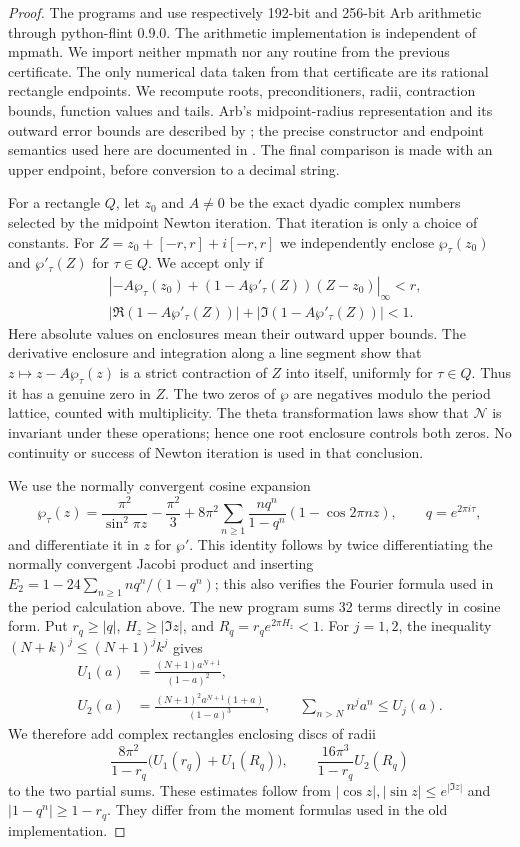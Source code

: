 \begin{proof}
The programs  and
 use respectively 192-bit and 256-bit
Arb arithmetic through python-flint 0.9.0. The arithmetic implementation
is independent of mpmath. We import neither mpmath nor any routine
from the previous certificate. The only numerical data taken from that
certificate are its rational rectangle endpoints. We recompute roots,
preconditioners, radii, contraction bounds, function values and tails.
Arb's midpoint-radius representation and its outward error bounds are
described by \citet[Sections 2--3]{Johansson2016}; the precise
constructor and endpoint semantics used here are documented in
\citet{PythonFlint2026}. The final comparison is made with an upper
endpoint, before conversion to a decimal string.

For a rectangle $Q$, let $z_0$ and $A\ne0$ be the exact dyadic complex
numbers selected by the midpoint Newton iteration. That iteration is
only a choice of constants. For $Z=z_0+[-r,r]+i[-r,r]$ we independently
enclose $\wp_\tau(z_0)$ and $\wp'_\tau(Z)$ for $\tau\in Q$.
We accept only if
\[
 \begin{split}
 &\left|-A\wp_\tau(z_0)
 +(1-A\wp'_\tau(Z))(Z-z_0)\right|_\infty<r,\\
 &|\Re(1-A\wp'_\tau(Z))|
       +|\Im(1-A\wp'_\tau(Z))|<1.
 \end{split}
\]
Here absolute values on enclosures mean their outward upper bounds.
The derivative enclosure and integration along a line segment show
that $z\mapsto z-A\wp_\tau(z)$ is a strict contraction of $Z$ into
itself, uniformly for $\tau\in Q$. Thus it has a genuine zero in $Z$.
The two zeros of $\wp$ are negatives modulo the period lattice, counted
with multiplicity. The theta transformation laws show that
$\mathcal N$ is invariant under these operations; hence one root
enclosure controls both zeros. No continuity or success of Newton
iteration is used in that conclusion.

We use the normally convergent cosine expansion
\[
 \wp_\tau(z)=\frac{\pi^2}{\sin^2\pi z}-\frac{\pi^2}{3}
 +8\pi^2\sum_{n\geq1}\frac{nq^n}{1-q^n}
                      (1-\cos 2\pi nz),\qquad q=e^{2\pi i\tau},
\]
and differentiate it in $z$ for $\wp'$. This identity follows by twice
differentiating the normally convergent Jacobi product and inserting
$E_2=1-24\sum_{n\geq1}nq^n/(1-q^n)$; this also verifies the
Fourier formula used in the period calculation above. The new program sums
32 terms directly in cosine form. Put $r_q\geq|q|$,
$H_z\geq|\Im z|$, and $R_q=r_q e^{2\pi H_z}<1$.
For $j=1,2$, the inequality $(N+k)^j\leq(N+1)^jk^j$ gives
\[
 \begin{aligned}
 U_1(a)&=\frac{(N+1)a^{N+1}}{(1-a)^2},\\
 U_2(a)&=\frac{(N+1)^2a^{N+1}(1+a)}{(1-a)^3},
 \qquad
 \sum_{n>N}n^j a^n\leq U_j(a).
 \end{aligned}
\]
We therefore add complex rectangles enclosing discs of radii
\[
 \frac{8\pi^2}{1-r_q}\bigl(U_1(r_q)+U_1(R_q)\bigr),
 \qquad \frac{16\pi^3}{1-r_q}U_2(R_q)
\]
to the two partial sums. These estimates follow from
$|\cos z|,|\sin z|\leq e^{|\Im z|}$ and
$|1-q^n|\geq1-r_q$. They differ from the moment formulas used in
the old implementation.


\end{proof}

